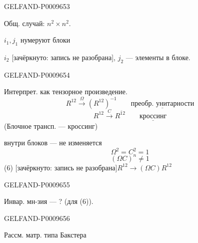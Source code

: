 \begin{GelfandAdjacentEvidence}{GELFAND-P000965}{3}

\begin{flushright}Общ. случай: $n^2\times n^2$.\end{flushright}

$i_1,j_1$ нумеруют блоки

$i_2$ [зачёркнуто: запись не разобрана], $j_2$ --- элементы в блоке.
\end{GelfandAdjacentEvidence}
\begin{GelfandAdjacentEvidence}{GELFAND-P000965}{4}


Интерпрет. как тензорное произведение.
\begin{equation*}
 R^{12}\overset{\Omega}{\longrightarrow}(R^{12})^{-1}
 \qquad\underline{\text{преобр. унитарности}}\tag{2}
\end{equation*}
\begin{equation*}
 R^{12}\overset{C}{\longrightarrow}R^{\bar{1}2}
 \qquad\underline{\text{кроссинг}}\tag{3}
\end{equation*}
(Блочное трансп. --- кроссинг)

внутри блоков --- не изменяется
\begin{equation*}
 \Omega^2=C^2=1\tag{4}
\end{equation*}
\begin{equation*}
 (\Omega C)^n\ne1\tag{5}
\end{equation*}
(6) [зачёркнуто: запись не разобрана]\quad $R^{12}\longrightarrow(\Omega C)R^{12}$
\end{GelfandAdjacentEvidence}
\begin{GelfandAdjacentEvidence}{GELFAND-P000965}{5}


Инвар. мн-зия --- ? (для (6)).
\end{GelfandAdjacentEvidence}
\begin{GelfandAdjacentEvidence}{GELFAND-P000965}{6}


Рассм. матр. типа Бакстера
\end{GelfandAdjacentEvidence}
